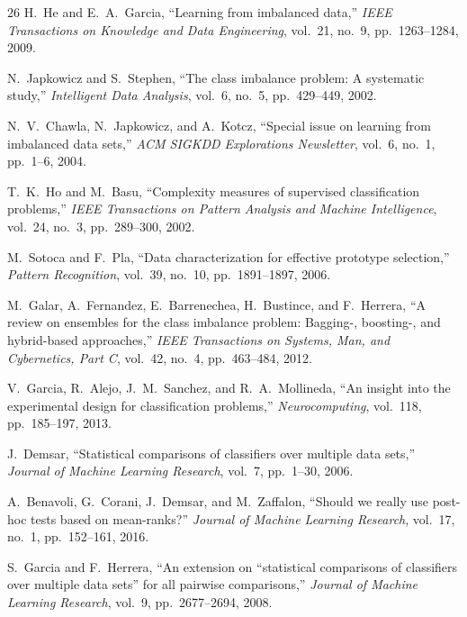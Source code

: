 \documentclass{ijSmartGrid}
\theoremstyle{definition}
\begin{document}
\begin{thebibliography}{26}
H.~He and E.~A.~Garcia,
``Learning from imbalanced data,''
\emph{IEEE Transactions on Knowledge and Data Engineering}, vol.~21, no.~9, pp.~1263--1284, 2009.

N.~Japkowicz and S.~Stephen,
``The class imbalance problem: A systematic study,''
\emph{Intelligent Data Analysis}, vol.~6, no.~5, pp.~429--449, 2002.

N.~V.~Chawla, N.~Japkowicz, and A.~Kotcz,
``Special issue on learning from imbalanced data sets,''
\emph{ACM SIGKDD Explorations Newsletter}, vol.~6, no.~1, pp.~1--6, 2004.

T.~K.~Ho and M.~Basu,
``Complexity measures of supervised classification problems,''
\emph{IEEE Transactions on Pattern Analysis and Machine Intelligence}, vol.~24, no.~3, pp.~289--300, 2002.

M.~Sotoca and F.~Pla,
``Data characterization for effective prototype selection,''
\emph{Pattern Recognition}, vol.~39, no.~10, pp.~1891--1897, 2006.

M.~Galar, A.~Fernandez, E.~Barrenechea, H.~Bustince, and F.~Herrera,
``A review on ensembles for the class imbalance problem: Bagging-, boosting-, and hybrid-based approaches,''
\emph{IEEE Transactions on Systems, Man, and Cybernetics, Part C}, vol.~42, no.~4, pp.~463--484, 2012.

V.~Garcia, R.~Alejo, J.~M.~Sanchez, and R.~A.~Mollineda,
``An insight into the experimental design for classification problems,''
\emph{Neurocomputing}, vol.~118, pp.~185--197, 2013.

J.~Demsar,
``Statistical comparisons of classifiers over multiple data sets,''
\emph{Journal of Machine Learning Research}, vol.~7, pp.~1--30, 2006.

A.~Benavoli, G.~Corani, J.~Demsar, and M.~Zaffalon,
``Should we really use post-hoc tests based on mean-ranks?''
\emph{Journal of Machine Learning Research}, vol.~17, no.~1, pp.~152--161, 2016.

S.~Garcia and F.~Herrera,
``An extension on ``statistical comparisons of classifiers over multiple data sets'' for all pairwise comparisons,''
\emph{Journal of Machine Learning Research}, vol.~9, pp.~2677--2694, 2008.


\end{thebibliography}
\end{document}
